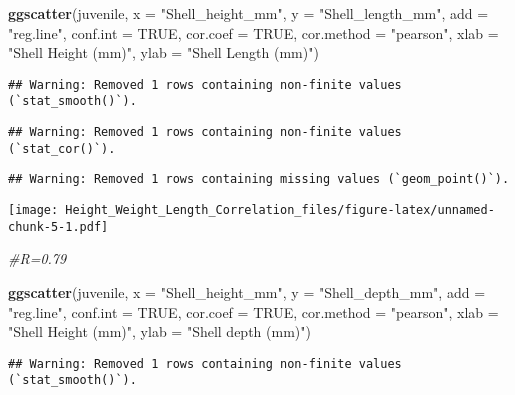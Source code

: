 \documentclass[
]{article}
\newenvironment{Shaded}{\begin{snugshade}}{\end{snugshade}}
\newcommand{\AttributeTok}[1]{\textcolor[rgb]{0.13,0.29,0.53}{#1}}
\newcommand{\CommentTok}[1]{\textcolor[rgb]{0.56,0.35,0.01}{\textit{#1}}}
\newcommand{\ConstantTok}[1]{\textcolor[rgb]{0.56,0.35,0.01}{#1}}
\newcommand{\FunctionTok}[1]{\textcolor[rgb]{0.13,0.29,0.53}{\textbf{#1}}}
\newcommand{\NormalTok}[1]{#1}
\newcommand{\StringTok}[1]{\textcolor[rgb]{0.31,0.60,0.02}{#1}}
\begin{document}
\begin{Shaded}
\begin{Highlighting}[]
\FunctionTok{ggscatter}\NormalTok{(juvenile, }\AttributeTok{x =} \StringTok{"Shell\_height\_mm"}\NormalTok{, }\AttributeTok{y =} \StringTok{"Shell\_length\_mm"}\NormalTok{, }
          \AttributeTok{add =} \StringTok{"reg.line"}\NormalTok{, }\AttributeTok{conf.int =} \ConstantTok{TRUE}\NormalTok{, }
          \AttributeTok{cor.coef =} \ConstantTok{TRUE}\NormalTok{, }\AttributeTok{cor.method =} \StringTok{"pearson"}\NormalTok{,}
          \AttributeTok{xlab =} \StringTok{"Shell Height (mm)"}\NormalTok{, }\AttributeTok{ylab =} \StringTok{"Shell Length (mm)"}\NormalTok{)}
\end{Highlighting}
\end{Shaded}

\begin{verbatim}
## Warning: Removed 1 rows containing non-finite values (`stat_smooth()`).
\end{verbatim}

\begin{verbatim}
## Warning: Removed 1 rows containing non-finite values (`stat_cor()`).
\end{verbatim}

\begin{verbatim}
## Warning: Removed 1 rows containing missing values (`geom_point()`).
\end{verbatim}

\texttt{[image: Height\_Weight\_Length\_Correlation\_files/figure-latex/unnamed-chunk-5-1.pdf]}

\begin{Shaded}
\begin{Highlighting}[]
\CommentTok{\#R=0.79}

\FunctionTok{ggscatter}\NormalTok{(juvenile, }\AttributeTok{x =} \StringTok{"Shell\_height\_mm"}\NormalTok{, }\AttributeTok{y =} \StringTok{"Shell\_depth\_mm"}\NormalTok{, }
          \AttributeTok{add =} \StringTok{"reg.line"}\NormalTok{, }\AttributeTok{conf.int =} \ConstantTok{TRUE}\NormalTok{, }
          \AttributeTok{cor.coef =} \ConstantTok{TRUE}\NormalTok{, }\AttributeTok{cor.method =} \StringTok{"pearson"}\NormalTok{,}
          \AttributeTok{xlab =} \StringTok{"Shell Height (mm)"}\NormalTok{, }\AttributeTok{ylab =} \StringTok{"Shell depth (mm)"}\NormalTok{)}
\end{Highlighting}
\end{Shaded}

\begin{verbatim}
## Warning: Removed 1 rows containing non-finite values (`stat_smooth()`).
\end{verbatim}
\end{document}
